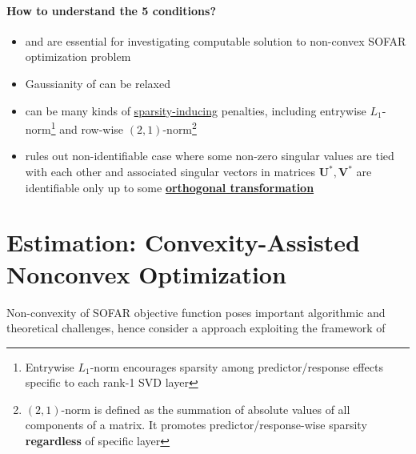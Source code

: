 \documentclass[twoside]{article}
\begin{document}
\paragraph{How to understand the 5 conditions?}
\begin{itemize}
    \item {} and  are essential for investigating computable solution to non-convex SOFAR optimization problem 
    \item Gaussianity of  can be relaxed 
    \item {} can be many kinds of \underline{sparsity-inducing} penalties, including entrywise $L_1$-norm\footnote{Entrywise $L_1$-norm encourages sparsity among predictor/response effects specific to each rank-1 SVD layer} and row-wise $(2,1)$-norm\footnote{$(2,1)$-norm is defined as the summation of absolute values of all components of a matrix. It promotes predictor/response-wise sparsity \textbf{regardless} of specific layer}
    \item {} rules out non-identifiable case where some non-zero singular values are tied with each other and associated singular vectors in matrices $\mathbf{U}^*,\mathbf{V}^*$ are identifiable only up to some \textbf{\underline{orthogonal transformation}}
\end{itemize}

\section{Estimation: Convexity-Assisted Nonconvex Optimization}
Non-convexity of SOFAR objective function poses important algorithmic and theoretical challenges, hence consider a  approach exploiting the framework of 

%
%
\end{document}
